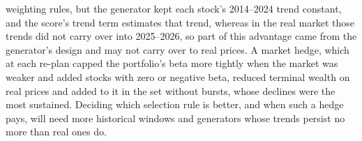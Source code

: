 weighting rules, but the generator kept each stock's 2014--2024 trend constant, and the score's trend term estimates
that trend, whereas in the real market those trends did not carry over into 2025--2026, so
part of this advantage came from the generator's design and may not carry over to real prices. A market hedge, which at
each re-plan capped the portfolio's beta more tightly when the market was weaker and added stocks with zero or negative beta, reduced
terminal wealth on real prices and added to it in the set without bursts, whose declines were the most sustained. Deciding which selection rule is
better, and when such a hedge pays, will need more historical windows and generators whose trends persist no more
than real ones do.
